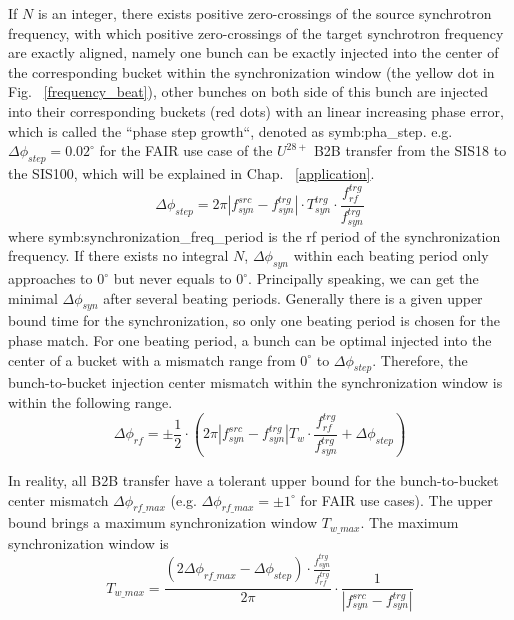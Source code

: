 If $N$ is an integer, there exists positive zero-crossings of the source synchrotron frequency, with which positive zero-crossings of the target synchrotron frequency are exactly aligned, namely one bunch can be exactly injected into the center of the corresponding bucket within the synchronization window (the yellow dot in Fig. ~\ref{frequency_beat}), other bunches on both side of this bunch are injected into their corresponding buckets (red dots) with an linear increasing phase error, which is called the ``phase step growth``, denoted as \gls{symb:pha_step}. e.g. $\Delta \phi_\mathit{step}=0.02^\circ$ for the FAIR use case of the $U^{28+}$ B2B transfer from the SIS18 to the SIS100, which will be explained in Chap. ~\ref{application}.
\begin{equation}
\Delta \phi_\mathit{step}=2\pi|f_{\mathit{syn}}^\mathit{src}-f_{\mathit{syn}}^\mathit{trg}| \cdot T_{\mathit{syn}}^\mathit{trg}\cdot \frac{f_{\mathit{rf}}^\mathit{trg}}{f_{\mathit{syn}}^\mathit{trg}}\label{step_growth}
\end{equation}
where \gls{symb:synchronization_freq_period} is the rf period of the synchronization frequency.
If there exists no integral $N$, $\Delta \phi_\mathit{syn}$ within each beating period only approaches to $0^\circ$ but never equals to $0^\circ$. Principally speaking, we can get the minimal $\Delta \phi_\mathit{syn}$ after several beating periods.  Generally there is a given upper bound time for the synchronization, so only one beating period is chosen for the phase match. For one beating period, a bunch can be optimal injected into the center of a bucket with a mismatch range from $0^\circ$ to $\Delta \phi_\mathit{step}$. Therefore, the bunch-to-bucket injection center mismatch within the synchronization window is within the following range.
\begin{equation}
\Delta \phi_\mathit{rf}=\pm \frac{1}{2}\cdot (2\pi|f_{\mathit{syn}}^\mathit{src}-f_{\mathit{syn}}^\mathit{trg}|T_\mathit{w}\cdot \frac{f_{\mathit{rf}}^\mathit{trg}}{f_{\mathit{syn}}^\mathit{trg}}+\Delta \phi_\mathit{step})
\end{equation}

In reality, all B2B transfer have a tolerant upper bound for the bunch-to-bucket center mismatch $\Delta \phi_\mathit{rf\_max}$ (e.g. $\Delta \phi_\mathit{rf\_max}=\pm1^\circ$ for FAIR use cases). The upper bound brings a maximum synchronization window $T_{w\_max}$. The maximum synchronization window is 
\begin{equation}
T_{w\_max}=\frac{(2\Delta \phi_\mathit{rf\_max}-\Delta \phi_\mathit{step})\cdot\frac{f_{\mathit{syn}}^\mathit{trg}}{f_{\mathit{rf}}^\mathit{trg}}}{2\pi}\cdot\frac{1}{|f_{\mathit{syn}}^\mathit{src}-f_{\mathit{syn}}^\mathit{trg}|}
\end{equation}




